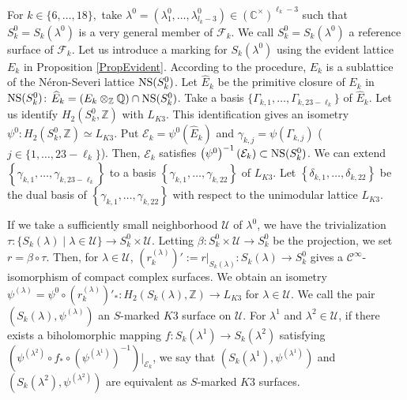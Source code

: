\documentclass[10pt]{article}
\begin{document}
 
For $k\in \{6,\ldots, 18\},$
take  $\lambda^0 =(\lambda_1^0,\ldots, \lambda_{l_k-3}^0) \in (\mathbb{C}^\times)^{\ell_k-3}$
such that $S_k^0 = S_k (\lambda^0)$ is a very general member of $\mathscr{F}_k$.
We call $S_k^0=S_k (\lambda^0)$  a reference surface of  $\mathscr{F}_k$.
Let us introduce a marking for $S_k(\lambda^0)$ using the evident lattice $E_k$ in Proposition \ref{PropEvident}.
According to the procedure,
$E_k$ is a sublattice of the N\'eron-Severi lattice ${\rm NS}(S_k^0)$.
Let $\widehat{E}_k$ be the primitive closure of $E_k$ in ${\rm NS}(S_k^0)$:
$\widehat{E}_k = (E_k \otimes_\mathbb{Z} \mathbb{Q}) \cap {\rm NS}(S_k^0)$.
Take a basis $\{\Gamma_{k,1},\ldots, \Gamma_{k,23 -\ell_k}\}$ of $\widehat{E}_k$. 
 Let us identify $H_2 (S_k^0,\mathbb{Z}) $ with  $L_{K3}$.
 This identification gives an isometry
 $\psi^0: H_2 (S_k^0,\mathbb{Z}) \simeq L_{K3}$.
 Put $\mathcal{E}_k = \psi^0 \left(\widehat{E}_k \right)$ and $\gamma_{k,j}  =\psi \left(\Gamma_{k,j} \right)$ ($j \in\{1,\ldots, 23-\ell_k\}$).
Then, $\mathcal{E}_k$ satisfies $\left(\psi^0\right)^{-1} (\mathcal{E}_k) \subset{\rm NS}(S_k^0)$.
We can  extend $\left\{\gamma_{k,1},\ldots, \gamma_{k,23-\ell_k}\right\}$ to  a basis $\left\{\gamma_{k,1},\ldots, \gamma_{k,22} \right\}$ of $L_{K3}$.
 Let $\left\{ \delta_{k,1},\ldots, \delta_{k,22}  \right\}$ be the dual basis of $\left\{\gamma_{k,1},\ldots, \gamma_{k,22}\right\}$ with respect to the unimodular lattice $L_{K3}$.
 
  
 
If we take a sufficiently small neighborhood $\mathcal{U}$ of $\lambda^0$, we have the  trivialization
$\tau: \{S_k(\lambda)\mid\lambda\in \mathcal{U}\} \rightarrow S_k^0 \times \mathcal{U}$.
Letting $\beta: S_k^0 \times \mathcal{U} \rightarrow S_k^0$ be the projection, 
we set $r=\beta \circ \tau.$
Then, for $\lambda\in \mathcal{U}$,
$\left(r^{(\lambda)}_k \right) ' := r|_{S_k(\lambda)}: S_k(\lambda)\rightarrow S_k^0 $ gives a $\mathcal{C}^\infty $-isomorphism of compact complex surfaces.
We obtain an isometry
$\psi^{(\lambda)}= \psi^0 \circ \left(r^{(\lambda)}_k \right) '_{*} : H_2(S_k(\lambda),\mathbb{Z}) \rightarrow L_{K3}$ for $\lambda \in \mathcal{U}$. 
We call the pair $(S_k(\lambda),\psi^{(\lambda)})$ an $S$-marked $K3$ surface on $\mathcal{U}$.
For $\lambda^1$ and $\lambda^2\in \mathcal{U}$,
if there exists a biholomorphic mapping $f : S_k (\lambda^1) \rightarrow S_k(\lambda^2)$ satisfying
$\left( \psi^{\left( \lambda^2 \right)} \circ f_* \circ \left(\psi^{\left( \lambda^1 \right)} \right)^{-1} \right)\Big|_{\mathcal{E}_k}$, 
we say that
$\left( S_k (\lambda^1),\psi^{\left( \lambda^1 \right)} \right)$ and $\left( S_k (\lambda^2), \psi^{\left( \lambda^2 \right)} \right)$ are equivalent as $S$-marked $K3$ surfaces.
\end{document}
